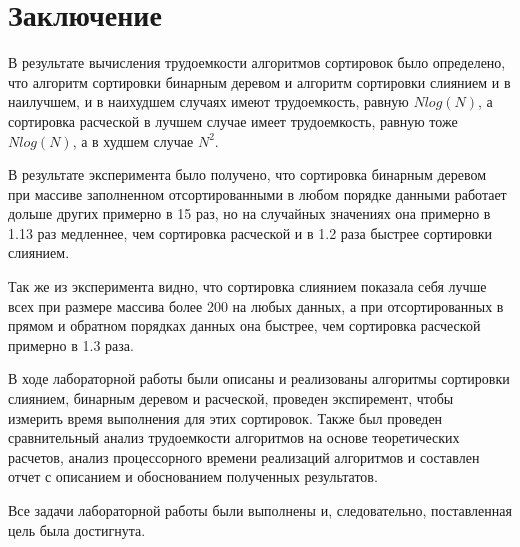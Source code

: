 \chapter*{Заключение}

В результате вычисления трудоемкости алгоритмов сортировок было определено, что алгоритм сортировки бинарным деревом и алгоритм сортировки слиянием и в наилучшем, и в наихудшем случаях имеют трудоемкость, равную $Nlog(N)$, а сортировка расческой в лучшем случае имеет трудоемкость, равную тоже $Nlog(N)$, а в худшем случае $N^2$.

В результате эксперимента было получено, что сортировка бинарным деревом при массиве заполненном отсортированными в любом порядке данными работает дольше других примерно в 15 раз, но на случайных значениях она примерно в 1.13 раз медленнее, чем сортировка расческой и в 1.2 раза быстрее сортировки слиянием.

Так же из эксперимента видно, что сортировка слиянием показала себя лучше всех при размере массива более 200 на любых данных, а при отсортированных в прямом и обратном порядках данных она быстрее, чем сортировка расческой примерно в 1.3 раза.

В ходе лабораторной работы были описаны и реализованы алгоритмы сортировки слиянием, бинарным деревом и расческой, проведен экспиремент, чтобы измерить время выполнения для этих сортировок. Также был проведен сравнительный анализ трудоемкости алгоритмов на основе теоретических расчетов, анализ процессорного времени реализаций алгоритмов и составлен отчет с описанием и обоснованием полученных результатов.

Все задачи лабораторной работы были выполнены и, следовательно, поставленная цель была достигнута.